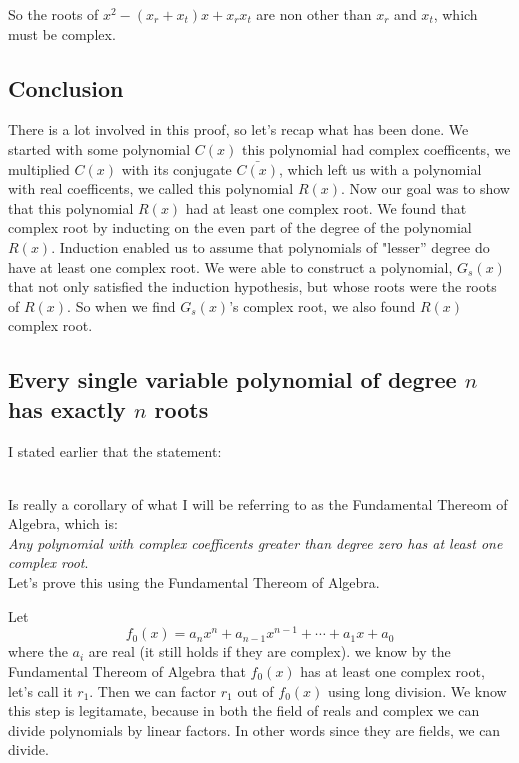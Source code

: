 \documentclass[12pt]{article}
\begin{document}
So the roots of $x^2 - (x_r +x_t)x + x_r x_t$ are non other than $x_r$ and $x_t$, which must be complex.

\subsection*{Conclusion}

There is a lot involved in this proof, so let's recap what has been done.  We started with some polynomial $C(x)$ this polynomial had complex coefficents, we multiplied $C(x)$ with its conjugate $\bar{C(x)}$, which left us with a polynomial with real coefficents, we called this polynomial $R(x)$.  Now our goal was to show that this polynomial $R(x)$ had at least one complex root.  We found that complex root by inducting on the even part of the degree of the polynomial $R(x)$.  Induction enabled us to assume that polynomials of "lesser'' degree do have at least one complex root.  We were able to construct a polynomial, $G_s(x)$ that not only satisfied the induction hypothesis, but whose roots were the roots of $R(x)$.  So when we find $G_s(x)$'s complex root, we also found $R(x)$ complex root.


\subsection*{Every single variable polynomial of degree $n$ has exactly $n$ roots}
I stated earlier that the statement:

\\


Is really a corollary of what I will be referring to as the Fundamental Thereom of Algebra, which is:\\

 \emph{Any polynomial with complex coefficents greater than degree zero has at least one complex root}.\\

Let's prove this using the Fundamental Thereom of Algebra.

Let 
$$f_0(x) = a_n x^n + a_{n-1} x^{n-1} + \cdots + a_1 x + a_0$$
where the $a_i$ are real (it still holds if they are complex).  we know by the Fundamental Thereom of Algebra that $f_0(x)$ has at least one complex root, let's call it $r_1$.  Then we can factor $r_1$ out of $f_0(x)$ using long division.  We know this step is legitamate, because in both the field of reals and complex we can divide polynomials by linear factors.  In other words since they are fields, we can divide.\\
\end{document}
